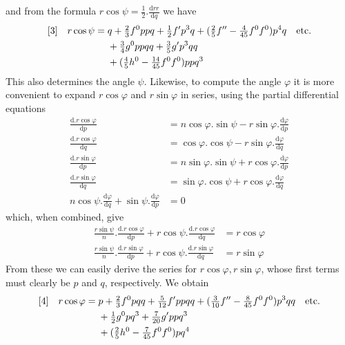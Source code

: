 %
and from the formula \(r\cos\psi=\tfrac{1}{2}\mathord{.}\frac{\mathrm{d}rr}{\mathrm{d}q}\) we have
\[
\begin{aligned}
\relax[3]\quad r\cos\psi={}&q+\tfrac{2}{3}f^0ppq+\tfrac{1}{2}f'p^3q+(\tfrac{2}{5}f''-\tfrac{4}{45}f^0f^0)p^4q\quad\text{etc.}\\
&+\tfrac{3}{4}g^0ppqq+\tfrac{3}{5}g'p^3qq\\
&+(\tfrac{4}{5}h^0-\tfrac{14}{45}f^0f^0)ppq^3
\end{aligned}
\]
This also determines the angle \(\psi\). Likewise, to compute the angle \(\varphi\) it is more convenient to expand \(r\cos\varphi\) and \(r\sin\varphi\) in series, using the partial differential equations
\[
\begin{aligned}
\frac{\mathrm{d}\mathord{.}r\cos\varphi}{\mathrm{d}p}&=n\cos\varphi\mathord{.}\sin\psi-r\sin\varphi\mathord{.}\frac{\mathrm{d}\varphi}{\mathrm{d}p}\\
\frac{\mathrm{d}\mathord{.}r\cos\varphi}{\mathrm{d}q}&=\cos\varphi\mathord{.}\cos\psi-r\sin\varphi\mathord{.}\frac{\mathrm{d}\varphi}{\mathrm{d}q}\\
\frac{\mathrm{d}\mathord{.}r\sin\varphi}{\mathrm{d}p}&=n\sin\varphi\mathord{.}\sin\psi+r\cos\varphi\mathord{.}\frac{\mathrm{d}\varphi}{\mathrm{d}p}\\
\frac{\mathrm{d}\mathord{.}r\sin\varphi}{\mathrm{d}q}&=\sin\varphi\mathord{.}\cos\psi+r\cos\varphi\mathord{.}\frac{\mathrm{d}\varphi}{\mathrm{d}q}\\
n\cos\psi\mathord{.}\frac{\mathrm{d}\varphi}{\mathrm{d}q}+\sin\psi\mathord{.}\frac{\mathrm{d}\varphi}{\mathrm{d}p}&=0
\end{aligned}
\]
which, when combined, give
\[
\begin{aligned}
\frac{r\sin\psi}{n}\mathord{.}\frac{\mathrm{d}\mathord{.}r\cos\varphi}{\mathrm{d}p}+r\cos\psi\mathord{.}\frac{\mathrm{d}\mathord{.}r\cos\varphi}{\mathrm{d}q}&=r\cos\varphi\\
\frac{r\sin\psi}{n}\mathord{.}\frac{\mathrm{d}\mathord{.}r\sin\varphi}{\mathrm{d}p}+r\cos\psi\mathord{.}\frac{\mathrm{d}\mathord{.}r\sin\varphi}{\mathrm{d}q}&=r\sin\varphi
\end{aligned}
\]
From these we can easily derive the series for \(r\cos\varphi,r\sin\varphi\), whose first terms must clearly be \(p\) and \(q\), respectively. We obtain
\[
\begin{aligned}
\relax[4]\quad r\cos\varphi={}&p+\tfrac{2}{3}f^0pqq+\tfrac{5}{12}f'ppqq+(\tfrac{3}{10}f''-\tfrac{8}{45}f^0f^0)p^3qq\quad\text{etc.}\\
&+\tfrac{1}{2}g^0pq^3+\tfrac{7}{20}g'ppq^3\\
&+(\tfrac{2}{5}h^0-\tfrac{7}{45}f^0f^0)pq^4
\end{aligned}
\]
